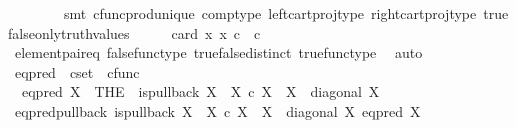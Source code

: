 \begin{isabellebody}
\ \ \ \ \ \ \ \ smt\ cfunc{\isacharunderscore}{\kern0pt}prod{\isacharunderscore}{\kern0pt}unique\ comp{\isacharunderscore}{\kern0pt}type\ left{\isacharunderscore}{\kern0pt}cart{\isacharunderscore}{\kern0pt}proj{\isacharunderscore}{\kern0pt}type\ right{\isacharunderscore}{\kern0pt}cart{\isacharunderscore}{\kern0pt}proj{\isacharunderscore}{\kern0pt}type\ true{\isacharunderscore}{\kern0pt}false{\isacharunderscore}{\kern0pt}only{\isacharunderscore}{\kern0pt}truth{\isacharunderscore}{\kern0pt}values{\isacharparenright}{\kern0pt}\isanewline
\ \ \isamarkupfalse%
\ \isamarkupfalse%
\ {\isachardoublequoteopen}card\ {\isacharbraceleft}{\kern0pt}x{\isachardot}{\kern0pt}\ x\ {\isasymin}\isactrlsub c\ {\isasymOmega}\ {\isasymtimes}\isactrlsub c\ {\isasymOmega}{\isacharbraceright}{\kern0pt}\ {\isacharequal}{\kern0pt}\ {}{\isachardoublequoteclose}\isanewline
\ \ \ \ \isamarkupfalse%
\ element{\isacharunderscore}{\kern0pt}pair{\isacharunderscore}{\kern0pt}eq\ false{\isacharunderscore}{\kern0pt}func{\isacharunderscore}{\kern0pt}type\ true{\isacharunderscore}{\kern0pt}false{\isacharunderscore}{\kern0pt}distinct\ true{\isacharunderscore}{\kern0pt}func{\isacharunderscore}{\kern0pt}type\ \isamarkupfalse%
\ auto\isanewline
{}\isamarkupfalse%
%
\endisatagproof
{\isafoldproof}%
%
\isadelimproof
%
\endisadelimproof
%
\isadelimdocument
%
\endisadelimdocument
%
\isatagdocument
%
\isamarkuptrue%
%
\endisatagdocument
{\isafolddocument}%
%
\isadelimdocument
%
\endisadelimdocument
{}\isamarkupfalse%
\ eq{\isacharunderscore}{\kern0pt}pred\ {\isacharcolon}{\kern0pt}{\isacharcolon}{\kern0pt}\ {\isachardoublequoteopen}cset\ {\isasymRightarrow}\ cfunc{\isachardoublequoteclose}\ \isanewline
\ \ {\isachardoublequoteopen}eq{\isacharunderscore}{\kern0pt}pred\ X\ {\isacharequal}{\kern0pt}\ {\isacharparenleft}{\kern0pt}THE\ {\isasymchi}{\isachardot}{\kern0pt}\ is{\isacharunderscore}{\kern0pt}pullback\ X\ {\isasymone}\ {\isacharparenleft}{\kern0pt}X\ {\isasymtimes}\isactrlsub c\ X{\isacharparenright}{\kern0pt}\ {\isasymOmega}\ {\isacharparenleft}{\kern0pt}{\isasymbeta}\isactrlbsub X\isactrlesub {\isacharparenright}{\kern0pt}\ {\isasymt}\ {\isacharparenleft}{\kern0pt}diagonal\ X{\isacharparenright}{\kern0pt}\ {\isasymchi}{\isacharparenright}{\kern0pt}{\isachardoublequoteclose}\isanewline
\isanewline
{}\isamarkupfalse%
\ eq{\isacharunderscore}{\kern0pt}pred{\isacharunderscore}{\kern0pt}pullback{\isacharcolon}{\kern0pt}\ {\isachardoublequoteopen}is{\isacharunderscore}{\kern0pt}pullback\ X\ {\isasymone}\ {\isacharparenleft}{\kern0pt}X\ {\isasymtimes}\isactrlsub c\ X{\isacharparenright}{\kern0pt}\ {\isasymOmega}\ {\isacharparenleft}{\kern0pt}{\isasymbeta}\isactrlbsub X\isactrlesub {\isacharparenright}{\kern0pt}\ {\isasymt}\ {\isacharparenleft}{\kern0pt}diagonal\ X{\isacharparenright}{\kern0pt}\ {\isacharparenleft}{\kern0pt}eq{\isacharunderscore}{\kern0pt}pred\ X{\isacharparenright}{\kern0pt}{\isachardoublequoteclose}\isanewline

\end{isabellebody}
